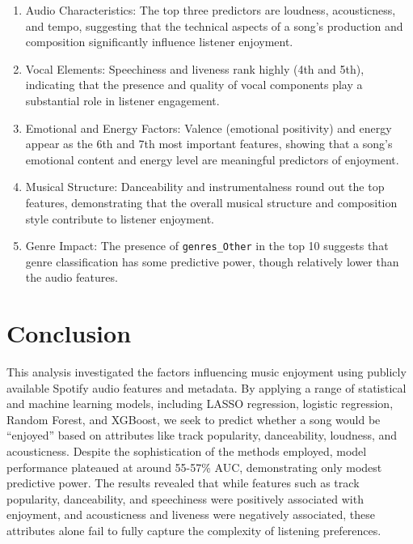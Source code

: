 \documentclass[11pt]{article}
\begin{document}
\begin{enumerate}
\def\labelenumi{\arabic{enumi}.}
\item
  Audio Characteristics: The top three predictors are loudness,
  acousticness, and tempo, suggesting that the technical aspects of a
  song's production and composition significantly influence listener
  enjoyment.
\item
  Vocal Elements: Speechiness and liveness rank highly (4th and 5th),
  indicating that the presence and quality of vocal components play a
  substantial role in listener engagement.
\item
  Emotional and Energy Factors: Valence (emotional positivity) and
  energy appear as the 6th and 7th most important features, showing that
  a song's emotional content and energy level are meaningful predictors
  of enjoyment.
\item
  Musical Structure: Danceability and instrumentalness round out the top
  features, demonstrating that the overall musical structure and
  composition style contribute to listener enjoyment.
\item
  Genre Impact: The presence of \texttt{genres\_Other} in the top 10
  suggests that genre classification has some predictive power, though
  relatively lower than the audio features.
\end{enumerate}

    \section{Conclusion}\label{conclusion}

This analysis investigated the factors influencing music enjoyment using
publicly available Spotify audio features and metadata. By applying a
range of statistical and machine learning models, including LASSO
regression, logistic regression, Random Forest, and XGBoost, we seek to
predict whether a song would be ``enjoyed'' based on attributes like
track popularity, danceability, loudness, and acousticness. Despite the
sophistication of the methods employed, model performance plateaued at
around 55-57\% AUC, demonstrating only modest predictive power. The
results revealed that while features such as track popularity,
danceability, and speechiness were positively associated with enjoyment,
and acousticness and liveness were negatively associated, these
attributes alone fail to fully capture the complexity of listening
preferences.
\end{document}
